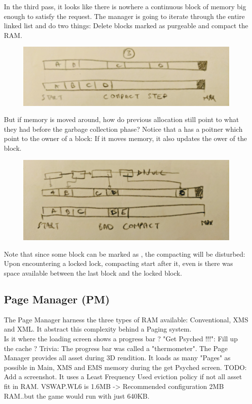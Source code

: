 \documentclass[book.tex]{subfiles}
\begin{document}
 \par
 In the third pass, it looks like there is nowhere a continuous block of memory big enough to satisfy the request. The manager is going to iterate through the entire linked list and do two things: Delete blocks marked as purgeable and compact the RAM.
  \par
\begin{figure}[H]
\centering
 \includegraphics[width=\textwidth]{imgs/mm_compact.png}
 \end{figure}
 \par
But if memory is moved around, how do previous allocation still point to what they had before the garbage collection phase? Notice that a  has a  poitner which point to the owner of a block: If it moves memory, it also updates the ower of the block.

   \par
\begin{figure}[H]
\centering
 \includegraphics[width=\textwidth]{imgs/mm_compact_bad_case.png}
 \end{figure}
 \par
 Note that since some block can be marked as , the compacting will be disturbed: Upon encountering a locked lock, compacting start after it, even is there was space available between the last block and the locked block.

\subsection{Page Manager (PM)}
The Page Manager harness the three types of RAM available: Conventional, XMS and XML. It abstract this complexity behind a Paging system.\\
Is it where the loading screen shows a progress bar ?
"Get Psyched !!!": Fill up the cache ?
Trivia: The progress bar was called a "thermometer".
The Page Manager provides all asset during 3D rendition. 
It loads as many "Pages" as possible in Main, XMS and EMS memory during the get Psyched screen.
TODO: Add a screenshot.
It uses a Least Frequency Used eviction policy if not all asset fit in RAM. VSWAP.WL6 is 1.6MB -> Recommended configuration 2MB RAM..but the game would run with just 640KB.
\end{document}
